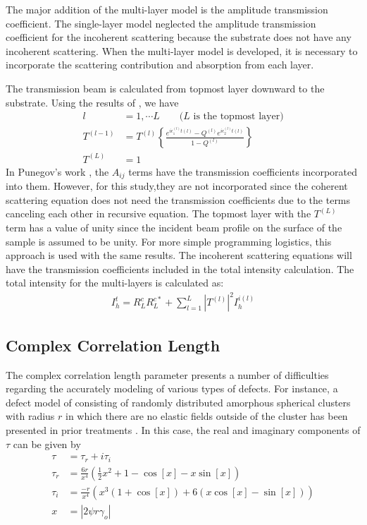The major addition of the multi-layer model is the amplitude transmission coefficient.  The single-layer model neglected the amplitude transmission coefficient for the incoherent scattering because the substrate does not have any incoherent scattering.  When the multi-layer model is developed, it is necessary to incorporate the scattering contribution and absorption from each layer.

The transmission beam is calculated from topmost layer downward to the substrate. Using the results of \cite{Punegov15}, we have
\begin{align}
l &= 1,\cdots L \qquad \text{($L$ is the topmost layer)}\\
T^{(l-1)} &= T^{(l)} \left\{   \frac{e^{i \epsilon^{(l)}_1 t(l)}-Q^{(l)} e^{i \epsilon_2^{(l)} t(l)}}{1-Q^{(l)}}  \right\}\\
T^{(L)} &= 1
\end{align}
In Punegov's work \cite{Punegov15}, the $A_{ij}$ terms have the transmission coefficients incorporated into them.  However, for this study,they are not incorporated since the coherent scattering equation does not need the transmission coefficients due to the terms canceling each other in recursive equation. The topmost layer with the $T^{(L)}$ term has a value of unity since the incident beam profile on the surface of the sample is assumed to be unity.  For more simple programming logistics, this approach is used with the same results.  The incoherent scattering equations will have the transmission coefficients included in the total intensity calculation.  The total intensity for the multi-layers is calculated as:
\begin{align}
I^t_h = R_L^c R_L^{c*} + \sum_{l=1}^L{|T^{(l)}|^2 I^{i(l)}_h}
\end{align}

		\subsection{Complex Correlation Length}

The complex correlation length parameter presents a number of difficulties regarding the accurately modeling of various types of defects. For instance, a defect model of consisting of randomly distributed amorphous spherical clusters with radius $r$ in which there are no elastic fields outside of the cluster has been presented in prior treatments \cite{Bushuev1}. In this case, the real and imaginary components of $\tau$ can be given by \cite{Bushuev1}
\begin{align}
\tau &= \tau_r + i \tau_i\\
\tau_r &= \frac{6 r}{x^4} (\frac{1}{2} x^2 +1-\cos[x] - x \sin [x])\\
\tau_i &= \frac{-r}{x^4}(x^3 (1+\cos [x]) +6(x \cos [x] - \sin[x]))\\
x &= |2 \psi r \gamma_o|
\end{align}


